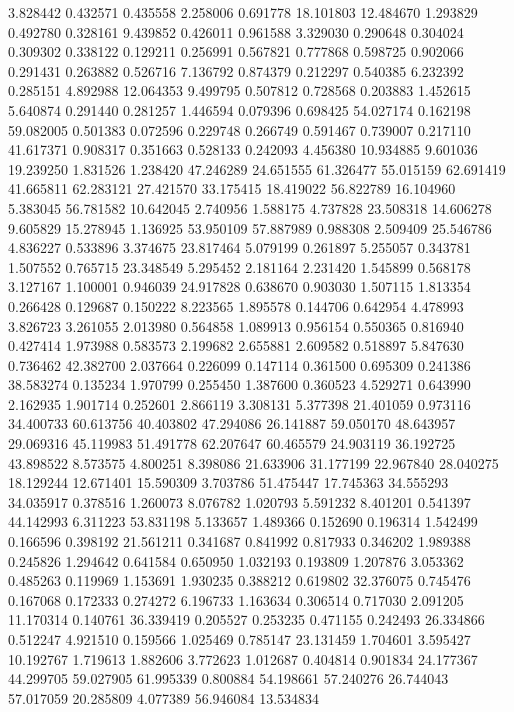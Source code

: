 3.828442
0.432571
0.435558
2.258006
0.691778
18.101803
12.484670
1.293829
0.492780
0.328161
9.439852
0.426011
0.961588
3.329030
0.290648
0.304024
0.309302
0.338122
0.129211
0.256991
0.567821
0.777868
0.598725
0.902066
0.291431
0.263882
0.526716
7.136792
0.874379
0.212297
0.540385
6.232392
0.285151
4.892988
12.064353
9.499795
0.507812
0.728568
0.203883
1.452615
5.640874
0.291440
0.281257
1.446594
0.079396
0.698425
54.027174
0.162198
59.082005
0.501383
0.072596
0.229748
0.266749
0.591467
0.739007
0.217110
41.617371
0.908317
0.351663
0.528133
0.242093
4.456380
10.934885
9.601036
19.239250
1.831526
1.238420
47.246289
24.651555
61.326477
55.015159
62.691419
41.665811
62.283121
27.421570
33.175415
18.419022
56.822789
16.104960
5.383045
56.781582
10.642045
2.740956
1.588175
4.737828
23.508318
14.606278
9.605829
15.278945
1.136925
53.950109
57.887989
0.988308
2.509409
25.546786
4.836227
0.533896
3.374675
23.817464
5.079199
0.261897
5.255057
0.343781
1.507552
0.765715
23.348549
5.295452
2.181164
2.231420
1.545899
0.568178
3.127167
1.100001
0.946039
24.917828
0.638670
0.903030
1.507115
1.813354
0.266428
0.129687
0.150222
8.223565
1.895578
0.144706
0.642954
4.478993
3.826723
3.261055
2.013980
0.564858
1.089913
0.956154
0.550365
0.816940
0.427414
1.973988
0.583573
2.199682
2.655881
2.609582
0.518897
5.847630
0.736462
42.382700
2.037664
0.226099
0.147114
0.361500
0.695309
0.241386
38.583274
0.135234
1.970799
0.255450
1.387600
0.360523
4.529271
0.643990
2.162935
1.901714
0.252601
2.866119
3.308131
5.377398
21.401059
0.973116
34.400733
60.613756
40.403802
47.294086
26.141887
59.050170
48.643957
29.069316
45.119983
51.491778
62.207647
60.465579
24.903119
36.192725
43.898522
8.573575
4.800251
8.398086
21.633906
31.177199
22.967840
28.040275
18.129244
12.671401
15.590309
3.703786
51.475447
17.745363
34.555293
34.035917
0.378516
1.260073
8.076782
1.020793
5.591232
8.401201
0.541397
44.142993
6.311223
53.831198
5.133657
1.489366
0.152690
0.196314
1.542499
0.166596
0.398192
21.561211
0.341687
0.841992
0.817933
0.346202
1.989388
0.245826
1.294642
0.641584
0.650950
1.032193
0.193809
1.207876
3.053362
0.485263
0.119969
1.153691
1.930235
0.388212
0.619802
32.376075
0.745476
0.167068
0.172333
0.274272
6.196733
1.163634
0.306514
0.717030
2.091205
11.170314
0.140761
36.339419
0.205527
0.253235
0.471155
0.242493
26.334866
0.512247
4.921510
0.159566
1.025469
0.785147
23.131459
1.704601
3.595427
10.192767
1.719613
1.882606
3.772623
1.012687
0.404814
0.901834
24.177367
44.299705
59.027905
61.995339
0.800884
54.198661
57.240276
26.744043
57.017059
20.285809
4.077389
56.946084
13.534834
